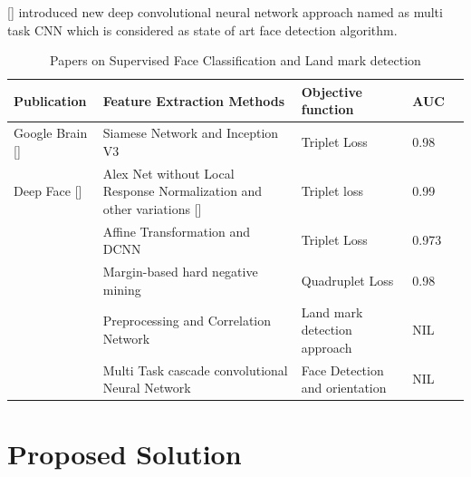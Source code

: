 \documentclass[a4paper,12pt, twoside]{NITKReport}
\begin{document}
[\cite{zhang2016joint}] introduced new deep convolutional neural network approach named as multi task CNN which is considered as state of art face detection algorithm.  

\begin{table}
  \centering
\begin{tabular}{ |p{3cm}|p{3cm}|p{2.5cm}|p{2cm}|p{2cm}|}
 \hline
 Publication & Feature Extraction Methods & Objective function & AUC\\
 \hline
 Google Brain [\cite{schroff2015facenet}] & Siamese Network and Inception V3 & Triplet Loss & 0.98\\
 \hline
 Deep Face [\cite{parkhi2015deep}] & Alex Net without Local Response Normalization and other variations [\cite{DBLP:journals/corr/SimonyanZ14a}] & Triplet loss & 0.99 \\
\hline
  [\cite{amos2016openface}] & Affine Transformation and DCNN & Triplet Loss & 0.973\\ 
 \hline
 [\cite{chen2017beyond}] & Margin-based hard negative mining & Quadruplet Loss & 0.98 \\
 \hline
 [\cite{zadeh2017convolutional}] & Preprocessing and Correlation Network & Land mark detection approach & NIL \\ 
 \hline
[\cite{zhang2016joint}] & Multi Task cascade convolutional Neural Network & Face Detection and orientation  & NIL \\
\hline
\end{tabular}
\caption{Papers on Supervised Face Classification and Land mark detection}\label{table:papers1}
\end{table}




\newpage
\chapter{Proposed Solution}
\label{chap3}
\label{solution}
\end{document}
